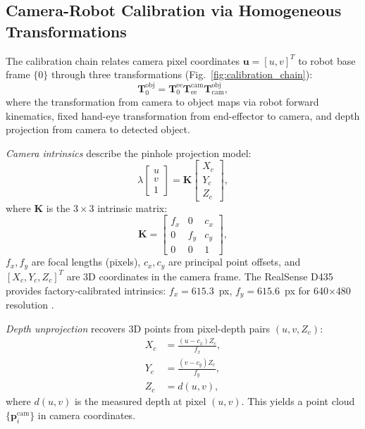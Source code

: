 \documentclass[journal]{IEEEtran}
\begin{document}
\subsection{Camera-Robot Calibration via Homogeneous Transformations}

The calibration chain relates camera pixel coordinates $\boldsymbol{u} = [u, v]^T$ to robot base frame $\{0\}$ through three transformations (Fig.~\ref{fig:calibration_chain}):
\begin{equation}
\mathbf{T}_{0}^{\text{obj}} = \mathbf{T}_{0}^{\text{ee}} \mathbf{T}_{\text{ee}}^{\text{cam}} \mathbf{T}_{\text{cam}}^{\text{obj}},
\label{eq:calibration_chain}
\end{equation}
where the transformation from camera to object maps via robot forward kinematics, fixed hand-eye transformation from end-effector to camera, and depth projection from camera to detected object.

\textit{Camera intrinsics} describe the pinhole projection model:
\begin{equation}
\lambda \begin{bmatrix} u \\ v \\ 1 \end{bmatrix} = \mathbf{K} \begin{bmatrix} X_c \\ Y_c \\ Z_c \end{bmatrix},
\label{eq:camera_projection}
\end{equation}
where $\mathbf{K}$ is the $3 \times 3$ intrinsic matrix:
\begin{equation}
\mathbf{K} = \begin{bmatrix}
f_x & 0 & c_x \\
0 & f_y & c_y \\
0 & 0 & 1
\end{bmatrix},
\label{eq:intrinsic_matrix}
\end{equation}
$f_x, f_y$ are focal lengths (pixels), $c_x, c_y$ are principal point offsets, and $[X_c, Y_c, Z_c]^T$ are 3D coordinates in the camera frame. The RealSense D435 provides factory-calibrated intrinsics: $f_x = 615.3$~px, $f_y = 615.6$~px for 640$\times$480 resolution \cite{intel2023realsense}.

\textit{Depth unprojection} recovers 3D points from pixel-depth pairs $(u, v, Z_c)$:
\begin{align}
X_c &= \frac{(u - c_x) Z_c}{f_x}, \label{eq:unproject_x} \\
Y_c &= \frac{(v - c_y) Z_c}{f_y}, \label{eq:unproject_y} \\
Z_c &= d(u, v), \label{eq:depth_lookup}
\end{align}
where $d(u, v)$ is the measured depth at pixel $(u, v)$. This yields a point cloud $\{\boldsymbol{p}_i^{\text{cam}}\}$ in camera coordinates.
\end{document}
